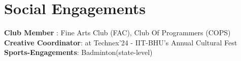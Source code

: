 \section{Social Engagements}
    \begin{itemize}[leftmargin=0.15in, label={}]
	\small{\item{
		\textbf{Club Member}{ : Fine Arts Club (FAC), Club Of Programmers (COPS)} \\
		\textbf{Creative Coordinator}{: at Technex'24 - IIT-BHU's Annual Cultural Fest} \\
        \textbf{Sports-Engagements}{: Badminton(state-level)}
	}}
    \end{itemize}